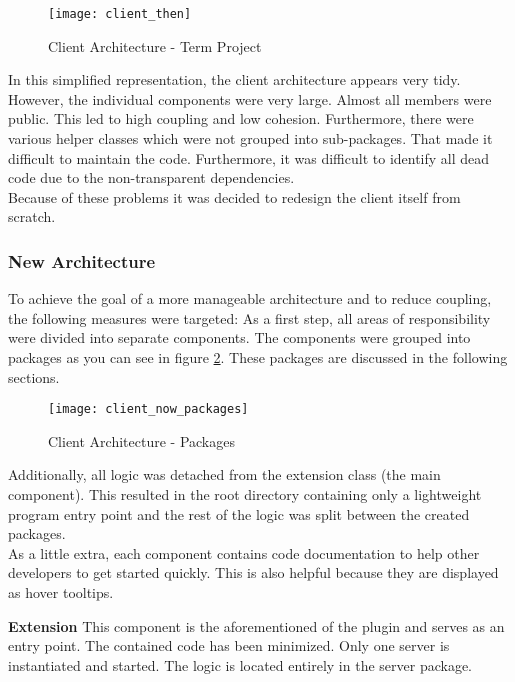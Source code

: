\begin{figure}[H]
    \centering
    \texttt{[image: client\_then]}
    \caption{Client Architecture - Term Project}
    \label{fig:client_then}
\end{figure}

In this simplified representation, the client architecture appears very tidy.
However, the individual components were very large.
Almost all members were public.
This led to high coupling and low cohesion.
Furthermore, there were various helper classes which were not grouped into sub-packages.
That made it difficult to maintain the code.
Furthermore, it was difficult to identify all dead code due to the non-transparent dependencies. \\

Because of these problems it was decided to redesign the client itself from scratch.

\subsubsection{New Architecture}
To achieve the goal of a more manageable architecture and to reduce coupling, the following measures were targeted:
As a first step, all areas of responsibility were divided into separate components.
The components were grouped into packages as you can see in figure \ref{fig:client_now_packages}.
These packages are discussed in the following sections. \\

\begin{figure}[H]
    \centering
    \texttt{[image: client\_now\_packages]}
    \caption{Client Architecture - Packages}
    \label{fig:client_now_packages}
\end{figure}

Additionally, all logic was detached from the extension class (the main component).
This resulted in the root directory containing only a lightweight program entry point
and the rest of the logic was split between the created packages. \\

As a little extra, each component contains code documentation to help other developers to get started quickly.
This is also helpful because they are displayed as hover tooltips.


{\bf Extension} \textendash{}
This component is the aforementioned  of the plugin and serves as an entry point.
The contained code has been minimized. Only one server is instantiated and started.
The logic is located entirely in the server package. \\

